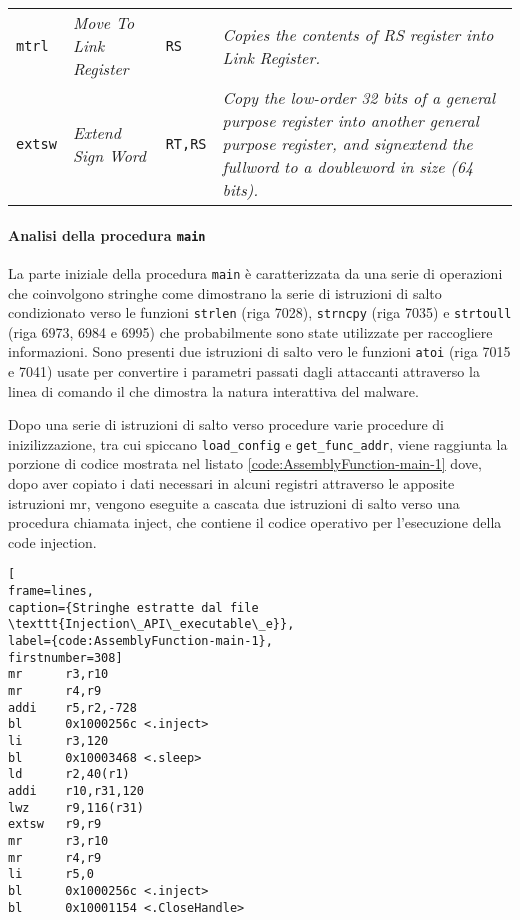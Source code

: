 \documentclass[10pt,a4paper, titlepage]{report}
\begin{document}
\begin{table}[h!]
\begin{center}
\begin{adjustbox}{center=\textwidth}
\begin{tabular}{l|l|l|p{6cm}}
	       	\texttt{mtrl} & \textit{Move To Link Register} & \texttt{RS} & \textit{Copies the contents of RS register into Link Register.} \\

\texttt{extsw} & \textit{Extend Sign Word} & \texttt{RT,RS} & \textit{Copy the low-order 32 bits of a general purpose register into another general purpose register, and signextend the fullword to a doubleword in size (64 bits).} \\
	       	
	      \bottomrule
	    \end{tabular}
	       \end{adjustbox}
	  \end{center}
	\end{table}

\paragraph{Analisi della procedura \texttt{main}} 

La parte iniziale della procedura \texttt{main} è caratterizzata da una serie di operazioni che coinvolgono stringhe come dimostrano la serie di istruzioni di salto condizionato verso le funzioni \texttt{strlen} (riga 7028), \texttt{strncpy} (riga 7035) e \texttt{strtoull} (riga 6973, 6984 e 6995) che probabilmente sono state utilizzate per raccogliere informazioni. Sono presenti due istruzioni di salto vero le funzioni \texttt{atoi} (riga 7015 e 7041) usate per convertire i parametri passati dagli attaccanti attraverso la linea di comando il che dimostra la natura interattiva del malware.

Dopo una serie di istruzioni di salto verso procedure varie procedure di inizilizzazione, tra cui spiccano \texttt{load\_config} e \texttt{get\_func\_addr}, viene raggiunta la porzione di codice mostrata nel listato \ref{code:AssemblyFunction-main-1} dove, dopo aver copiato i dati necessari in alcuni registri attraverso le apposite istruzioni mr, vengono eseguite a cascata due istruzioni di salto verso una procedura chiamata inject, che contiene il codice operativo per l'esecuzione della code injection. 

\begin{lstlisting}[
frame=lines, 
caption={Stringhe estratte dal file \texttt{Injection\_API\_executable\_e}}, 
label={code:AssemblyFunction-main-1},
firstnumber=308]
mr      r3,r10
mr      r4,r9
addi    r5,r2,-728
bl      0x1000256c <.inject>
li      r3,120
bl      0x10003468 <.sleep>
ld      r2,40(r1)
addi    r10,r31,120
lwz     r9,116(r31)
extsw   r9,r9
mr      r3,r10
mr      r4,r9
li      r5,0
bl      0x1000256c <.inject>
bl      0x10001154 <.CloseHandle>
\end{lstlisting}
\end{document}
